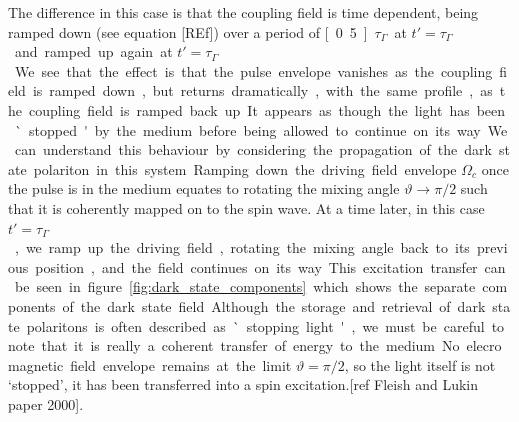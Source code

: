     The difference in this case is that the coupling field is time dependent,
    being ramped down (see equation [REf]) over a period of
    \unit[0.5]{$\tau_\Gamma$} at $t' = $\unit[4]{$\tau_\Gamma$} and ramped up
    again at $t' = $\unit[8]{$\tau_\Gamma$}.

    We see that the effect is that the pulse envelope vanishes as the coupling
    field is ramped down, but returns dramatically, with the same profile, as
    the coupling field is ramped back up. It appears as though the light has
    been `stopped' by the medium before being allowed to continue on its way. 

    We can understand this behaviour by considering the propagation of the dark
    state polariton in this system. Ramping down the driving field envelope
    $\Omega_c$ once the pulse is in the medium equates to rotating the mixing
    angle $\vartheta \rightarrow \pi/2$ such that it is coherently mapped on to
    the spin wave. At a time later, in this case $t' = $\unit[8]{$\tau_\Gamma$},
    we ramp up the driving field, rotating the mixing angle back to its previous
    position, and the field continues on its way. This excitation transfer can
    be seen in figure \ref{fig:dark_state_components} which shows the separate
    components of the dark state field.

    Although the storage and retrieval of dark state polaritons is often
    described as `stopping light', we must be careful to note that it is really
    a coherent transfer of energy to the medium. No elecromagnetic field
    envelope remains at the limit $\vartheta = \pi/2$, so the light itself is
    not `stopped', it has been transferred into a spin excitation.[ref Fleish
    and Lukin paper 2000].





